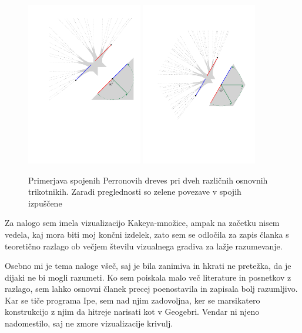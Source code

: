 \documentclass[a4paper, 12pt]{article}
\begin{document}
\begin{figure}[h!]
    \centering
    \includegraphics[width=0.45\textwidth]{ipe_slike/koncni_lik_90_napol_spoji.pdf}
    \includegraphics[width=0.45\textwidth]{ipe_slike/koncni_lik_60_napol_spoji.pdf}
    \caption{Primerjava spojenih Perronovih dreves pri dveh različnih osnovnih trikotnikih. Zaradi preglednosti so zelene povezave v spojih izpuščene}
    \label{60_90}
\end{figure}

Za nalogo sem imela vizualizacijo Kakeya-množice, ampak na začetku nisem vedela, kaj mora biti moj končni izdelek, zato sem se odločila za zapis članka s teoretično razlago ob večjem številu vizualnega gradiva za lažje razumevanje.

Osebno mi je tema naloge všeč, saj je bila zanimiva in hkrati ne pretežka, da je dijaki ne bi mogli razumeti. Ko sem poiskala malo več literature in posnetkov z razlago, sem lahko osnovni članek precej poenostavila in zapisala bolj razumljivo. Kar se tiče programa Ipe, sem nad njim zadovoljna, ker se marsikatero konstrukcijo z njim da hitreje narisati kot v Geogebri. Vendar ni njeno nadomestilo, saj ne zmore vizualizacije krivulj.

\newpage
\nocite{*}      %
\printbibliography[heading=bibintoc, title={Literatura}]

\end{document}
